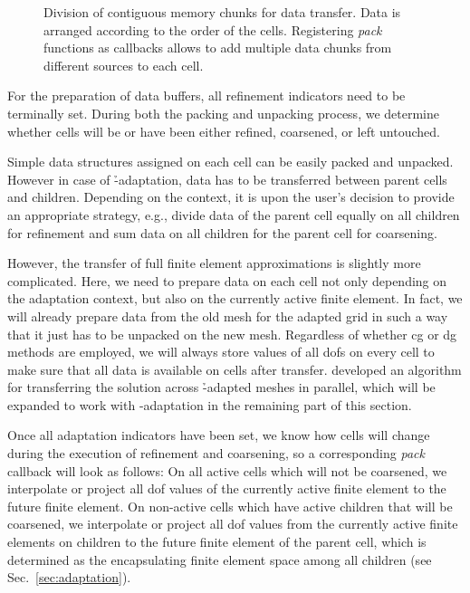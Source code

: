 \begin{figure}
\centering

\caption[Division of contiguous memory chunks for data transfer.]{Division of contiguous memory chunks for data transfer. Data is arranged according to the order of the cells. Registering \textit{pack} functions as callbacks allows to add multiple data chunks from different sources to each cell.}
\label{fig:memory}
\end{figure}

For the preparation of data buffers, all refinement indicators need to be terminally set. During both the packing and unpacking process, we determine whether cells will be or have been either refined, coarsened, or left untouched.

Simple data structures assigned on each cell can be easily packed and unpacked. However in case of \h-adaptation, data has to be transferred between parent cells and children. Depending on the context, it is upon the user's decision to provide an appropriate strategy, e.g., divide data of the parent cell equally on all children for refinement and sum data on all children for the parent cell for coarsening.

However, the transfer of full finite element approximations is slightly more complicated. Here, we need to prepare data on each cell not only depending on the adaptation context, but also on the currently active finite element. In fact, we will already prepare data from the old mesh for the adapted grid in such a way that it just has to be unpacked on the new mesh. Regardless of whether \gls{cg} or \gls{dg} methods are employed, we will always store values of all \glspl{dof} on every cell to make sure that
all data is available on cells after transfer. %
\textcite{bangerth2012} developed an algorithm for transferring the solution across \h-adapted meshes in parallel, which will be expanded to work with \hp-adaptation in the remaining part of this section.

Once all adaptation indicators have been set, we know how cells will change during the execution of refinement and coarsening, so a corresponding \textit{pack} callback will look as follows: On all active cells which will not be coarsened, we interpolate or project all \gls{dof} values of the currently active finite element to the future finite element. On non-active cells which have active children that will be coarsened, we interpolate or project all \gls{dof} values from the currently active finite elements on children to the future finite element of the parent cell, which is determined as the encapsulating finite element space among all children (see Sec.~\ref{sec:adaptation}).

